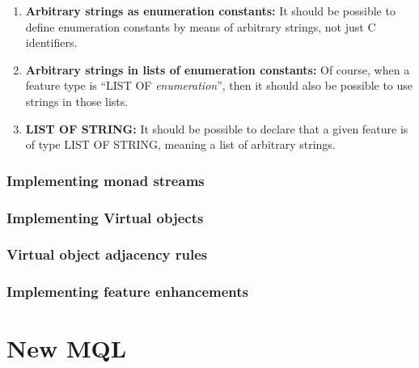 \documentclass[a4paper,12pt]{article}
\begin{document}
\begin{enumerate}
  \begin{enumerate}
    
  \item \textbf{Arbitrary strings as enumeration constants:} It
    should be possible to define enumeration constants by means of
    arbitrary strings, not just C identifiers.
    
  \item \textbf{Arbitrary strings in lists of enumeration constants:}
    Of course, when a feature type is ``LIST OF
    \textit{enumeration}'', then it should also be possible to use
    strings in those lists.
      
  \item \textbf{LIST OF STRING:} It should be possible to declare that
    a given feature is of type LIST OF STRING, meaning a list of
    arbitrary strings.
      
  \end{enumerate}
  
\end{enumerate}

\subsubsection{Implementing monad streams}

\subsubsection{Implementing Virtual objects}

\subsubsection{Virtual object adjacency rules}

\subsubsection{Implementing feature enhancements}

\section{New MQL}
\end{document}
